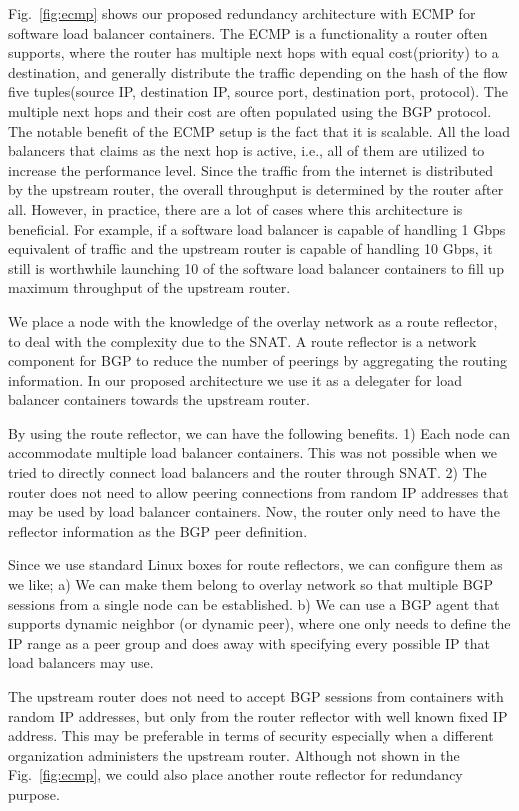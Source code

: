 Fig.~\ref{fig:ecmp} shows our proposed redundancy architecture with ECMP for software load balancer containers.
%
The ECMP is a functionality a router often supports, where the router has multiple next hops with equal cost(priority) to a destination, and generally distribute the traffic depending on the hash of the flow five tuples(source IP, destination IP, source port, destination port, protocol).
The multiple next hops and their cost are often populated using the BGP protocol.
%
The notable benefit of the ECMP setup is the fact that it is scalable.
All the load balancers that claims as the next hop is active, i.e., all of them are utilized to increase the performance level.
Since the traffic from the internet is distributed by the upstream router, the overall throughput is determined by the router after all.
However, in practice, there are a lot of cases where this architecture is beneficial.
For example, if a software load balancer is capable of handling 1 Gbps equivalent of traffic and the upstream router is capable of handling 10 Gbps, it still is worthwhile launching 10 of the software load balancer containers to fill up maximum throughput of the upstream router.

%
We place a node with the knowledge of the overlay network as a route reflector, to deal with the complexity due to the SNAT.
A route reflector is a network component for BGP to reduce the number of peerings by aggregating the routing information\cite{rfc4456}.
In our proposed architecture we use it as a delegater for load balancer containers towards the upstream router.

By using the route reflector, we can have the following benefits.
1) Each node can accommodate multiple load balancer containers. This was not possible when we tried to directly connect load balancers and the router through SNAT.
2) The router does not need to allow peering connections from random IP addresses that may be used by load balancer containers. Now, the router only need to have the reflector information as the BGP peer definition.

Since we use standard Linux boxes for route reflectors, we can configure them as we like;
a) We can make them belong to overlay network so that multiple BGP sessions from a single node can be established.
b) We can use a BGP agent that supports dynamic neighbor (or dynamic peer), where one only needs to define the IP range as a peer group and does away with specifying every possible IP that load balancers may use.

The upstream router does not need to accept BGP sessions from containers with random IP addresses, but only from the router reflector with well known fixed IP address. This may be preferable in terms of security especially when a different organization administers the upstream router.
Although not shown in the Fig.~\ref{fig:ecmp}, we could also place another route reflector for redundancy purpose.


